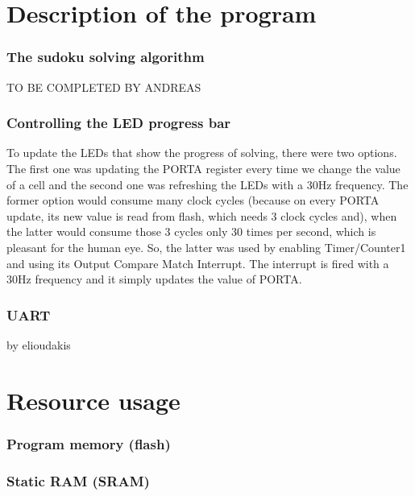 \documentclass[12pt, a4]{article}
\begin{document}
\section*{Description of the program}

\subsubsection*{The sudoku solving algorithm}
TO BE COMPLETED BY ANDREAS

\subsubsection*{Controlling the LED progress bar}
To update the LEDs that show the progress of solving, there were two options. The first one was updating the PORTA register every time we change the value of a cell and the second one was refreshing the LEDs with a 30Hz frequency. The former option would consume many clock cycles (because on every PORTA update, its new value is read from flash, which needs 3 clock cycles and), when the latter would consume those 3 cycles only 30 times per second, which is pleasant for the human eye. So, the latter was used by enabling Timer/Counter1 and using its Output Compare Match Interrupt. The interrupt is fired with a 30Hz frequency and it simply updates the value of PORTA.

\subsubsection*{UART}
by elioudakis

\section*{Resource usage}
\subsubsection*{Program memory (flash)}

\subsubsection*{Static RAM (SRAM)}
\end{document}
